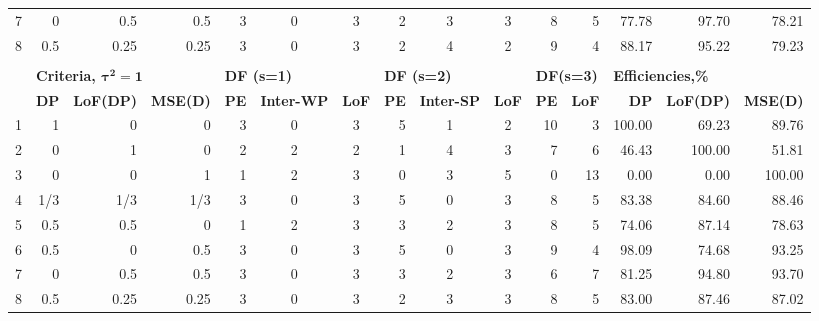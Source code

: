 \begin{table}[h]
{\begin{tabular}{rrrrccccccrrrrr}
7 & 0    & 0.5  & 0.5  & \multicolumn{1}{|r}{3} & 0 & 3 & \multicolumn{1}{|r}{2} & 3 & 3 & \multicolumn{1}{|r}{8}  & 5  & \multicolumn{1}{|r}{77.78}  & 97.70  & 78.21  \\
8 & 0.5  & 0.25 & 0.25 & \multicolumn{1}{|r}{3} & 0 & 3 & \multicolumn{1}{|r}{2} & 4 & 2 & \multicolumn{1}{|r}{9}  & 4  & \multicolumn{1}{|r}{88.17}  & 95.22  & 79.23  \\
  &      &      &      &   &   &   &   &   &   &    &    &        &        &        \\  
  & \multicolumn{3}{l}{\textbf{Criteria, $\bm{\tau^2=1}$}}    & \multicolumn{3}{l}{\textbf{DF (s=1)}}   & \multicolumn{3}{l}{\textbf{DF (s=2)}}    & \multicolumn{2}{l}{\textbf{DF(s=3)}} & \multicolumn{3}{l}{\textbf{Efficiencies,\%}}     \\
  & \textbf{DP} & \textbf{LoF(DP)} & \textbf{MSE(D)} & \textbf{PE} & \textbf{Inter-WP} & \textbf{LoF} & \textbf{PE} & \textbf{Inter-SP} & \textbf{LoF}& \textbf{PE}      & \textbf{LoF}      & \textbf{DP} & \textbf{LoF(DP)} & \textbf{MSE(D)} \\
1 & 1    & 0    & 0    & \multicolumn{1}{|r}{3} & 0 & 3 & \multicolumn{1}{|r}{5} & 1 & 2 & \multicolumn{1}{|r}{10} & 3  & \multicolumn{1}{|r}{100.00} & 69.23  & 89.76  \\
2 & 0    & 1    & 0    & \multicolumn{1}{|r}{2} & 2 & 2 & \multicolumn{1}{|r}{1} & 4 & 3 & \multicolumn{1}{|r}{7}  & 6  & \multicolumn{1}{|r}{46.43}  & 100.00 & 51.81  \\
3 & 0    & 0    & 1    & \multicolumn{1}{|r}{1} & 2 & 3 & \multicolumn{1}{|r}{0} & 3 & 5 & \multicolumn{1}{|r}{0}  & 13 & \multicolumn{1}{|r}{0.00}   & 0.00   & 100.00 \\
4 &1/3  & 1/3  & 1/3   & \multicolumn{1}{|r}{3} & 0 & 3 & \multicolumn{1}{|r}{5} & 0 & 3 & \multicolumn{1}{|r}{8}  & 5  & \multicolumn{1}{|r}{83.38}  & 84.60  & 88.46  \\
5 & 0.5  & 0.5  & 0    & \multicolumn{1}{|r}{1} & 2 & 3 & \multicolumn{1}{|r}{3} & 2 & 3 & \multicolumn{1}{|r}{8}  & 5  & \multicolumn{1}{|r}{74.06}  & 87.14  & 78.63  \\
6 & 0.5  & 0    & 0.5  & \multicolumn{1}{|r}{3} & 0 & 3 & \multicolumn{1}{|r}{5} & 0 & 3 & \multicolumn{1}{|r}{9}  & 4  & \multicolumn{1}{|r}{98.09}  & 74.68  & 93.25  \\
7 & 0    & 0.5  & 0.5  & \multicolumn{1}{|r}{3} & 0 & 3 & \multicolumn{1}{|r}{3} & 2 & 3 & \multicolumn{1}{|r}{6}  & 7  & \multicolumn{1}{|r}{81.25}  & 94.80  & 93.70  \\
8 & 0.5  & 0.25 & 0.25 & \multicolumn{1}{|r}{3} & 0 & 3 & \multicolumn{1}{|r}{2} & 3 & 3 & \multicolumn{1}{|r}{8}  & 5  & \multicolumn{1}{|r}{83.00}  & 87.46  & 87.02  
\end{tabular}
}
\end{table}  

